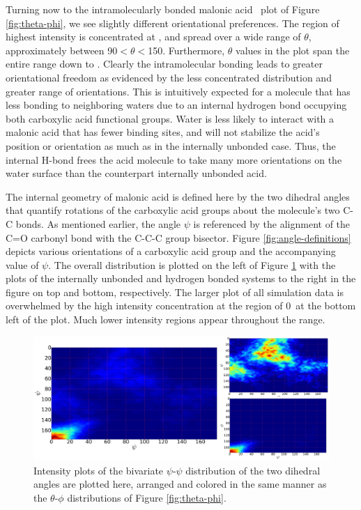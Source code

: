 Turning now to the intramolecularly bonded malonic acid \thetaphi~plot of Figure \ref{fig:theta-phi}, we see slightly different orientational preferences. The region of highest intensity is concentrated at \degr, and spread over a wide range of $\theta$, approximately between 90\degr $< \theta <$150\degr. Furthermore, $\theta$ values in the plot span the entire range down to \degr. Clearly the intramolecular bonding leads to greater orientational freedom as evidenced by the less concentrated distribution and greater range of orientations. This is intuitively expected for a molecule that has less bonding to neighboring waters due to an internal hydrogen bond occupying both carboxylic acid functional groups. Water is less likely to interact with a malonic acid that has fewer binding sites, and will not stabilize the acid's position or orientation as much as in the internally unbonded case. Thus, the internal H-bond frees the acid molecule to take many more orientations on the water surface than the counterpart internally unbonded acid.

The internal geometry of malonic acid is defined here by the two dihedral angles that quantify rotations of the carboxylic acid groups about the molecule's two C-C bonds. As mentioned earlier, the angle $\psi$ is referenced by the alignment of the C=O carbonyl bond with the C-C-C group bisector. Figure \ref{fig:angle-definitions} depicts various orientations of a carboxylic acid group and the accompanying value of $\psi$. The overall \psipsi distribution is plotted on the left of Figure \ref{fig:psi-psi} with the plots of the internally unbonded and hydrogen bonded systems to the right in the figure on top and bottom, respectively. The larger plot of all simulation data is overwhelmed by the high intensity concentration at the \psipsi region of 0\degr~at the bottom left of the plot. Much lower intensity regions appear throughout the \psipsi range.


\begin{figure}[h!]
	\begin{center}
		\includegraphics[scale=1.0]{images/orientation/psi-psi.png}
		\caption{Intensity plots of the bivariate $\psi$-$\psi$ distribution of the two dihedral angles are plotted here, arranged and colored in the same manner as the $\theta$-$\phi$ distributions of Figure \ref{fig:theta-phi}.} 
		\label{fig:psi-psi}
	\end{center}
\end{figure}

